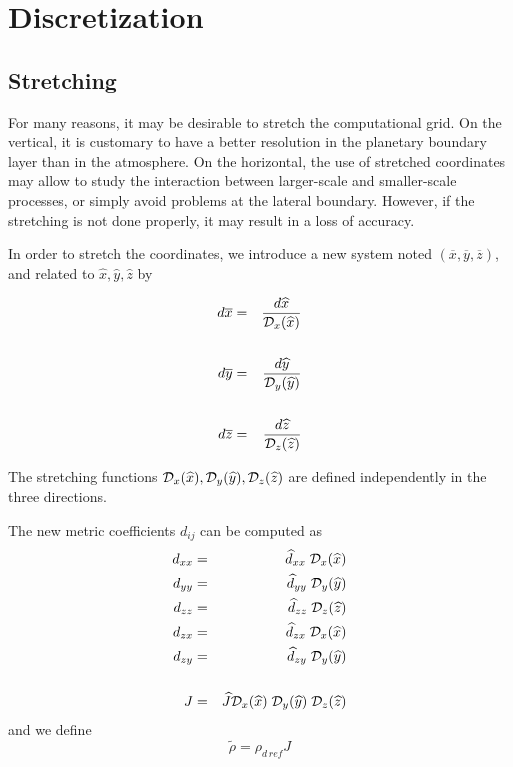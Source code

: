
\chapter{Discretization}
\minitoc


\section{Stretching}

For many reasons, it may be desirable to stretch the computational grid. On
the vertical, it is customary to have a better resolution in the planetary
boundary layer than in the atmosphere. On the horizontal, the use of stretched
coordinates may allow to study the interaction between larger-scale and
smaller-scale processes, or simply avoid problems at the lateral boundary.
However, if the stretching is not done properly, it may result in a loss of
accuracy.

In order to stretch the coordinates, we introduce a new system
noted $(\overline{x},\overline{y},\overline{z})$, and related to
$\widehat{x},\widehat{y},\widehat{z}$ by

\begin{eqnarray}
d\overline{x} & = & \dfrac{d\widehat{x}}{ {\cal D}_x(\widehat{x})}
\\
& & \\
d \overline{y}& = & \dfrac{d\widehat{y}}{ {\cal D}_y(\widehat{y})}
\\
 & & \\
d\overline{z} & = &\dfrac{ d\widehat{z}}{ {\cal D}_z(\widehat{z})}
\end{eqnarray}

The stretching functions
${\cal D}_x(\widehat{x}), {\cal D}_y(\widehat{y}),
{\cal D}_z(\widehat{z})$ are defined independently
in the three directions.


The new metric coefficients $d_{ij}$ can be computed as
\begin{eqnarray}
d_{xx} &=& \widehat{d}_{xx} \;{\cal D}_x(\widehat{x}) \nonumber  \\
d_{yy} &=& \widehat{d}_{yy} \;{\cal D}_y(\widehat{y}) \nonumber  \\
d_{zz} &=& \widehat{d}_{zz} \;{\cal D}_z(\widehat{z})  \\
d_{zx} &=& \widehat{d}_{zx} \;{\cal D}_x(\widehat{x}) \nonumber \\
d_{zy} &=& \widehat{d}_{zy} \;{\cal D}_y(\widehat{y}) \nonumber   \\
\nonumber \\
J&=& \widehat{J} {\cal D}_x(\widehat{x})\;{\cal D}_y(\widehat{y})\; {\cal D}_z
(\widehat{z})
\end{eqnarray}
and we define
\begin{equation}
\tilde{\rho}  = \rho_{d\,ref} J
\end{equation}

